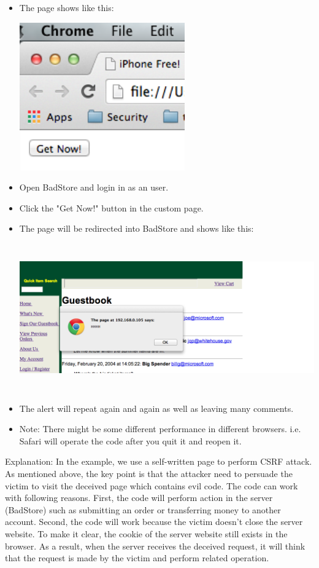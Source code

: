 \begin{enumerate}
\begin{itemize}
\begin{lstlisting}[language=HTML,numbers=left,numberstyle=\tiny,columns=fullflexible,basicstyle=\footnotesize\ttfamily]
		\end{lstlisting}
	\item The page shows like this:
	\begin{center}\includegraphics[height=2.5in]{csrf1}
	\end{center}
	\item Open BadStore and login in as an user.
	\item Click the "Get Now!" button in the custom page.
	\item The page will be redirected into BadStore and shows like this:
	\begin{center}\includegraphics[height=2.5in]{csrf2}
	\end{center}
	\item The alert will repeat again and again as well as leaving many comments.
	\item Note: There might be some different performance in different browsers. i.e. Safari will operate the code after you quit it and reopen it.
	\end{itemize}
	\indent Explanation: In the example, we use a self-written page to perform CSRF attack. As mentioned above, the key point is that the attacker need to persuade the victim to visit the deceived page which contains evil code. The code can work with following reasons. First, the code will perform action in the server (BadStore) such as submitting an order or transferring money to another account. Second, the code will work because the victim doesn't close the server website. To make it clear, the cookie of the server website still exists in the browser. As a result, when the server receives the deceived request, it will think that the request is made by the victim and perform related operation.

\end{enumerate}
